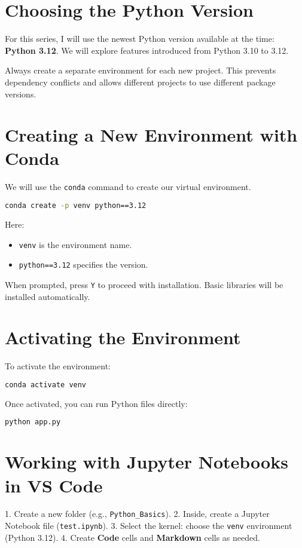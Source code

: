 \section{Choosing the Python Version}
For this series, I will use the newest Python version available at the time: \textbf{Python 3.12}.  
We will explore features introduced from Python 3.10 to 3.12.

\begin{noteBox}
Always create a separate environment for each new project.  
This prevents dependency conflicts and allows different projects to use different package versions.
\end{noteBox}

\section{Creating a New Environment with Conda}
We will use the \texttt{conda} command to create our virtual environment.

\begin{lstlisting}[language=bash, caption={Creating a Python 3.12 environment in Conda}]
conda create -p venv python==3.12
\end{lstlisting}

Here:
\begin{itemize}
    \item \texttt{venv} is the environment name.
    \item \texttt{python==3.12} specifies the version.
\end{itemize}

When prompted, press \texttt{Y} to proceed with installation.  
Basic libraries will be installed automatically.

\section{Activating the Environment}
To activate the environment:
\begin{lstlisting}[language=bash]
conda activate venv
\end{lstlisting}

Once activated, you can run Python files directly:
\begin{lstlisting}[language=bash]
python app.py
\end{lstlisting}

\section{Working with Jupyter Notebooks in VS Code}
1. Create a new folder (e.g., \texttt{Python\_Basics}).
2. Inside, create a Jupyter Notebook file (\texttt{test.ipynb}).
3. Select the kernel: choose the \texttt{venv} environment (Python 3.12).
4. Create \textbf{Code} cells and \textbf{Markdown} cells as needed.

